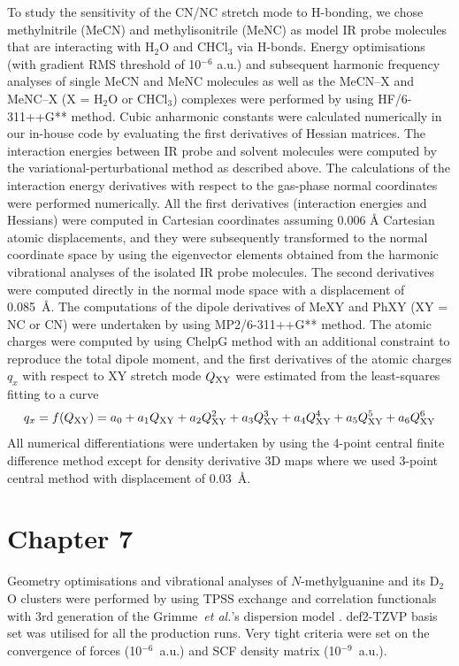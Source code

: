 \documentclass[a4paper,titlepage,twoside,fleqn,12pt]{book}
\begin{document}
\begin{appendices}
\begin{refsection}
To study the sensitivity of the CN/NC stretch mode to H-bonding, we chose methylnitrile
(MeCN) and methylisonitrile (MeNC) as model IR probe molecules that are interacting with 
H$_2$O and CHCl$_3$ via H-bonds. Energy optimisations (with gradient RMS threshold of 10$^{-6}$ a.u.) 
and subsequent harmonic frequency analyses of single MeCN and MeNC molecules as well 
as the MeCN--X and MeNC--X (X = H$_2$O or CHCl$_3$) complexes were performed by using 
HF/6-311++G** method. 
Cubic 
anharmonic constants were calculated numerically in our in\hyp{}house code by evaluating the 
first derivatives of Hessian matrices. The interaction energies between IR probe and solvent 
molecules were computed by the variational\hyp{}perturbational method
as described above. 
The calculations of the interaction energy derivatives with respect 
to the gas\hyp{}phase normal coordinates were performed numerically. All the first derivatives 
(interaction energies and Hessians) were computed in Cartesian coordinates assuming 0.006 \AA
Cartesian atomic displacements, and they were subsequently transformed to the normal 
coordinate space by using the eigenvector elements obtained from the harmonic vibrational 
analyses of the isolated IR probe molecules. The second derivatives were computed directly 
in the normal mode space with a displacement of 0.085~\AA. 
The computations of the dipole derivatives of MeXY and PhXY (XY = NC or CN) were 
undertaken by using MP2/6-311++G** method. 
The atomic charges were computed by 
using ChelpG method \citep{Breneman.Wiberg.JCC.1990} 
with an additional constraint to reproduce the total dipole moment, 
and the first derivatives of the atomic charges $q_x$ with respect to XY 
stretch mode $Q_{\rm XY}$ were estimated from the least\hyp{}squares fitting to a curve 
%
\begin{equation}
q_x=f(Q_{\rm XY}) = a_0 + a_1 Q_{\rm XY}   + a_2 Q_{\rm XY}^2 
                        + a_3 Q_{\rm XY}^3 + a_4 Q_{\rm XY}^4 
                        + a_5 Q_{\rm XY}^5 + a_6 Q_{\rm XY}^6
\end{equation}
%
All numerical differentiations were undertaken by using the 4-point central finite 
difference method except for density derivative 3D maps where we used 3-point central 
method with displacement of 0.03~\AA.

\section{Chapter 7}

Geometry optimisations and vibrational analyses of $N$-methylguanine
and its D$_2$O clusters were performed 
by using TPSS exchange and correlation 
functionals \citep{Tao.Perdew.Staroverov.Scuseria.PhysRevLett.2003} 
with 3rd generation of the Grimme~\emph{et al.}'s 
dispersion model \citep{Grimme.Antony.Ehrlich.Krieg.JCP.2010}.
def2-TZVP basis set \citep{Weigend.Ahlrichs.PCCP.2005,Weigend.PCCP.2006}
was utilised for all the production runs. Very tight criteria
were set on the convergence of forces (10$^{-6}$~a.u.) 
and SCF density matrix (10$^{-9}$~a.u.).


\end{refsection}
\end{appendices}
\end{document}
